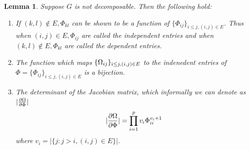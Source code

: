 \documentclass[12pt, leqno]{article}
\providecommand{\abs}[1]{\lvert#1\rvert}
\def\om{\ensuremath\Omega}
\newtheorem{lemma}{Lemma}[]
\begin{document}
\begin{lemma}
\label{lemma:nondecompcholsubset} 
Suppose $G$ is not decomposable. 
Then the following hold:
\begin{enumerate}
\item If $(k,l) \not\in E, \Phi_{kl}$ can be shown to be a
  function of $\{\Phi_{ij}\}_{i \leq j, (i,j) \in E}$. Thus when $(i,j) \in
  E, \Phi_{ij}$ are called the independent entries and when $(k,l) \not\in
  E, \Phi_{kl}$ are called the dependent entries. 
\item The function which maps $\{ \om_{ij} \}_{i \leq j,(i,j) \in E}$ to the
  indenedent entries of $\Phi = \{ \Phi_{ij} \}_{i \leq j, (i,j) \in E}$
    is a bijection.
\item The determinant of the Jacobian matrix, which informally we can
  denote as $\abs{\frac{\partial
  \om}{\partial \Phi}}$
\[
\abs{\frac{\partial
  \om}{\partial \Phi}} = \prod_{i=1}^p
  v_i \Phi_{ii}^{v_i + 1}\] where $v_i = \abs{\{ j: j>i, (i,j) \in
    E\}}$.
\end{enumerate}
\end{lemma}
\end{document}
